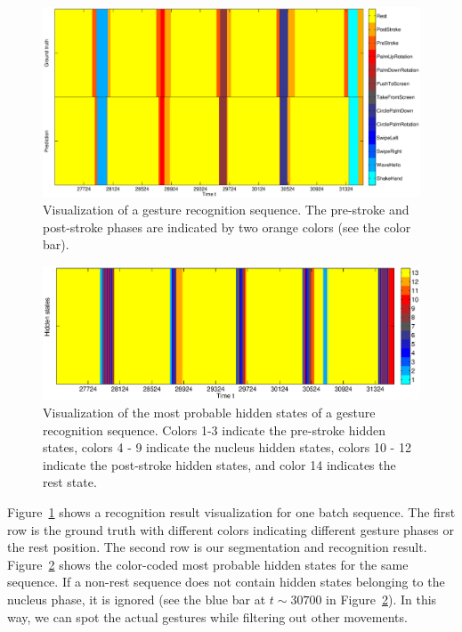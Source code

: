 \documentclass{sig-alternate-2013}
\begin{document}
\begin{figure}[tb]
\centering
\includegraphics[trim={4cm 1cm 0cm 0.6cm}, clip,
width=1\columnwidth]{fig/gesture.eps} \caption{Visualization of a gesture
recognition sequence.
The pre-stroke and post-stroke phases are indicated by two orange colors (see the color bar).}
\label{fig:decoding}
\end{figure}

\begin{figure}[tb]
\centering
\includegraphics[trim={3.5cm 0cm 0.5cm 0cm}, clip,
width=1\columnwidth]{fig/hiddenstates.eps} \caption{Visualization of the most
probable hidden states of a gesture recognition sequence.
Colors 1-3 indicate the pre-stroke hidden states, colors 4 - 9
indicate the nucleus hidden states, colors 10 - 12 indicate the post-stroke
hidden states, and color 14 indicates the rest state.}
\label{fig:hiddenstates}
\end{figure}

Figure~\ref{fig:decoding} shows a recognition result visualization for one batch sequence. The first
row is the ground truth with different colors indicating different gesture phases or the rest position. 
The second row is our segmentation and recognition result.
Figure~\ref{fig:hiddenstates} shows the color-coded most probable hidden states
for the same sequence.
If a non-rest sequence does not contain hidden states belonging to the nucleus
phase, it is ignored (see the blue bar at $t\sim 30700$ in Figure~\ref{fig:hiddenstates}).
In this way, we can spot the actual gestures while filtering out other movements.
\end{document}
